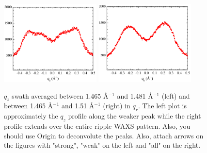 \begin{figure}[htbp]
  \centering
  \includegraphics[width=0.45\textwidth]{figures/ripple/tWAXS/twaxs_weak_qz}
  \includegraphics[width=0.45\textwidth]{figures/ripple/tWAXS/twaxs_both_qz}
  \caption{$q_z$ swath averaged between 1.465 \AA$^{-1}$ and 1.481 \AA$^{-1}$
  (left) and between 1.465 \AA$^{-1}$ and 1.51 \AA$^{-1}$ (right) in $q_r$.
  The left plot is approximately the $q_z$ profile along the weaker peak
  while the right profile extends over the entire ripple WAXS pattern.
  {\jn Also, you should use Origin to deconvolute the 
  peaks.  Also, attach arrows on the figures with "strong", "weak" on the 
  left and "all" on the right.}}
  \label{fig:twaxs_qzplot}
\end{figure}  


